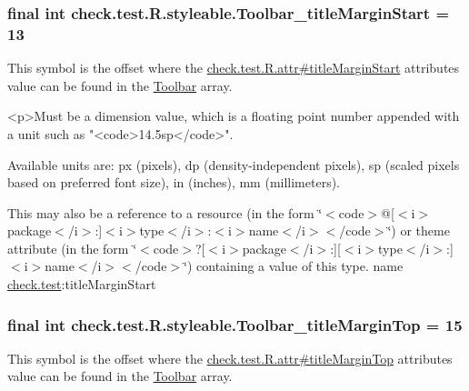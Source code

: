 \subsubsection[{Toolbar\+\_\+title\+Margin\+Start}]{\setlength{\rightskip}{0pt plus 5cm}final int check.\+test.\+R.\+styleable.\+Toolbar\+\_\+title\+Margin\+Start = 13\hspace{0.3cm}{\ttfamily [static]}}\label{classcheck_1_1test_1_1_r_1_1styleable_a4a55fbefdcf687934e2c57f3a12cfb1d}
This symbol is the offset where the \hyperlink{classcheck_1_1test_1_1_r_1_1attr_a09d7811f39e20d8013b4a96d09150900}{check.\+test.\+R.\+attr\#title\+Margin\+Start} attribute\textquotesingle{}s value can be found in the \hyperlink{classcheck_1_1test_1_1_r_1_1styleable_a1a7fa90223693abef77e7484cca2df54}{Toolbar} array.

\begin{DoxyVerb}      <p>Must be a dimension value, which is a floating point number appended with a unit such as "<code>14.5sp</code>".
\end{DoxyVerb}
 Available units are\+: px (pixels), dp (density-\/independent pixels), sp (scaled pixels based on preferred font size), in (inches), mm (millimeters). 

This may also be a reference to a resource (in the form \char`\"{}$<$code$>$@\mbox{[}$<$i$>$package$<$/i$>$\+:\mbox{]}$<$i$>$type$<$/i$>$\+:$<$i$>$name$<$/i$>$$<$/code$>$\char`\"{}) or theme attribute (in the form \char`\"{}$<$code$>$?\mbox{[}$<$i$>$package$<$/i$>$\+:\mbox{]}\mbox{[}$<$i$>$type$<$/i$>$\+:\mbox{]}$<$i$>$name$<$/i$>$$<$/code$>$\char`\"{}) containing a value of this type.  name \hyperlink{namespacecheck_1_1test}{check.\+test}\+:title\+Margin\+Start \hypertarget{classcheck_1_1test_1_1_r_1_1styleable_a90b959cc7186d99612ffd6e5a1ded83b}{}
\subsubsection[{Toolbar\+\_\+title\+Margin\+Top}]{\setlength{\rightskip}{0pt plus 5cm}final int check.\+test.\+R.\+styleable.\+Toolbar\+\_\+title\+Margin\+Top = 15\hspace{0.3cm}{\ttfamily [static]}}\label{classcheck_1_1test_1_1_r_1_1styleable_a90b959cc7186d99612ffd6e5a1ded83b}
This symbol is the offset where the \hyperlink{classcheck_1_1test_1_1_r_1_1attr_ae16b8b538a7ee6adc4c7b58aaefb3b5c}{check.\+test.\+R.\+attr\#title\+Margin\+Top} attribute\textquotesingle{}s value can be found in the \hyperlink{classcheck_1_1test_1_1_r_1_1styleable_a1a7fa90223693abef77e7484cca2df54}{Toolbar} array.

